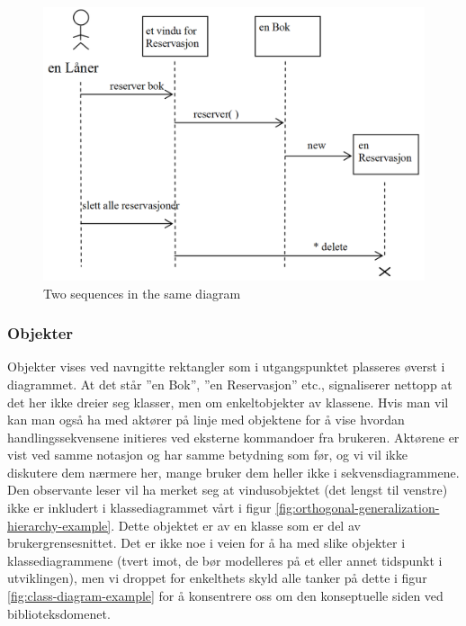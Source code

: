 \begin{figure}[H]
    \centering
    \includegraphics[scale=0.35]{resources/two-sequences-one-diagram-example.PNG}
    \caption{Two sequences in the same diagram}
    \label{fig:two-sequences-one-diagram-example}
\end{figure}

\subsubsection{Objekter}

Objekter vises ved navngitte rektangler som i utgangspunktet plasseres øverst i diagrammet. At det står ”en Bok”, ”en Reservasjon” etc., signaliserer nettopp at det her ikke dreier seg klasser, men om enkeltobjekter av klassene. Hvis man vil kan man også ha med aktører på linje med objektene for å vise hvordan handlingssekvensene initieres ved eksterne kommandoer fra brukeren. Aktørene er vist ved samme notasjon og har samme betydning som før, og vi vil ikke diskutere dem nærmere her, mange bruker dem heller ikke i sekvensdiagrammene. Den observante leser vil ha merket seg at vindusobjektet (det lengst til venstre) ikke er inkludert i klassediagrammet vårt i figur \ref{fig:orthogonal-generalization-hierarchy-example}. Dette objektet er av en klasse som er del av brukergrensesnittet. Det er ikke noe i veien for å ha med slike objekter i klassediagrammene (tvert imot, de bør modelleres på et eller annet tidspunkt i utviklingen), men vi droppet for enkelthets skyld alle tanker på dette i figur \ref{fig:class-diagram-example} for å konsentrere oss om den konseptuelle siden ved biblioteksdomenet.

